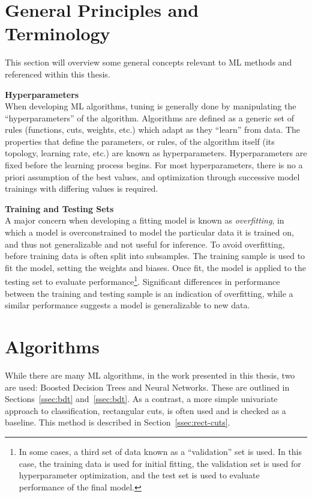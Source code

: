 \section{General Principles and Terminology}

This section will overview some general concepts relevant to \gls{ML} methods and referenced within this thesis.

\noindent\textbf{Hyperparameters}\\
\indent When developing \gls{ML} algorithms, tuning is generally done by manipulating the ``hyperparameters'' of the algorithm. Algorithms are defined as a generic set of rules (functions, cuts, weights, etc.) which adapt as they ``learn'' from data. The properties that define the parameters, or rules, of the algorithm itself (its topology, learning rate, etc.) are known as hyperparameters. Hyperparameters are fixed before the learning process begins. For most hyperparameters, there is no a priori assumption of the best values, and optimization through successive model trainings with differing values is required.

\noindent\textbf{Training and Testing Sets}\\
\indent A major concern when developing a fitting model is known as \textit{overfitting}, in which a model is overconstrained to model the particular data it is trained on, and thus not generalizable and not useful for inference. To avoid overfitting, before training data is often split into subsamples. The training sample is used to fit the model, setting the weights and biases. Once fit, the model is applied to the testing set to evaluate performance\footnote{In some cases, a third set of data known as a ``validation'' set is used. In this case, the training data is used for initial fitting, the validation set is used for hyperparameter optimization, and the test set is used to evaluate performance of the final model.}. Significant differences in performance between the training and testing sample is an indication of overfitting, while a similar performance suggests a model is generalizable to new data.


\section{Algorithms}

While there are many \gls{ML} algorithms, in the work presented in this thesis, two are used: Boosted Decision Trees and Neural Networks. These are outlined in Sections~\ref{ssec:bdt} and~\ref{ssec:bdt}. As a contrast, a more simple univariate approach to classification, rectangular cuts, is often used and is checked as a baseline. This method is described in Section~\ref{ssec:rect-cuts}.

